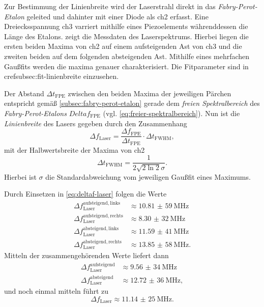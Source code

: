 \documentclass[../bericht.tex]{subfiles}
\begin{document}
        Zur Bestimmung der Linienbreite wird der Laserstrahl direkt in das \textit{Fabry-Perot-Etalon} geleited und dahinter mit einer Diode als ch2 erfasst. Eine Dreiecksspannung ch3 varriert mithilfe eines Piezoelements w\"ahrenddessen die L\"ange des Etalons.  zeigt die Messdaten des Laserspektrums. Hierbei liegen die ersten beiden Maxima von ch2 auf einem aufsteigenden Ast von ch3 und die zweiten beiden auf dem folgenden absteigenden Ast. Mithilfe eines mehrfachen Gau\ss{}fits werden die maxima genauer charakterisiert. Die Fitparameter sind in cref{subsec:fit-linienbreite} einzusehen.

        Der Abstand $\Delta t_\mathrm{FPE}$ zwischen den beiden Maxima der jeweiligen P\"archen entspricht gem\"a\ss{} \cref{subsec:fabry-perot-etalon} gerade dem \textit{freien Spektralbereich} des \textit{Fabry-Perot-Etalons} $Delta f_\mathrm{FPE}$ (vgl. \cref{eq:freier-spektralbereich}). Nun ist die \textit{Linienbreite} des Lasers gegeben durch den Zusammenhang
        \begin{equation}
          \Delta f_\mathrm{Laser} = \frac{\Delta f_\mathrm{FPE}}{\Delta t_\mathrm{FPE}}\cdot \Delta t_\mathrm{FWHM},
          \label{eq:deltaf-laser}
        \end{equation}
        mit der Halbwertsbreite der Maxima von ch2
        \begin{equation*}
          \Delta t_\mathrm{FWHM}=\frac{1}{2\sqrt{2\ln 2}\sigma}.
        \end{equation*}
        Hierbei ist $\sigma$ die Standardabweichung vom jeweiligen Gau\ss{}fit eines Maximums.

        Durch Einsetzen in \cref{eq:deltaf-laser} folgen die Werte
        \begin{align*}
          \Delta f_\mathrm{Laser}^\mathrm{aufsteigend, links}&\approx\SI{10,81(59)}{\mega\hertz} \\
          \Delta f_\mathrm{Laser}^\mathrm{aufsteigend, rechts}&\approx\SI{8,30(32)}{\mega\hertz} \\
          \Delta f_\mathrm{Laser}^\mathrm{absteigend, links}&\approx\SI{11,59(41)}{\mega\hertz} \\
          \Delta f_\mathrm{Laser}^\mathrm{absteigend, rechts}&\approx\SI{13,85(58)}{\mega\hertz}.
        \end{align*}
        Mitteln der zusammengeh\"orenden Werte liefert dann
        \begin{align*}
          \Delta f_\mathrm{Laser}^\mathrm{aufsteigend}&\approx\SI{9,56(34)}{\mega\hertz} \\
          \Delta f_\mathrm{Laser}^\mathrm{absteigend}&\approx\SI{12,72(36)}{\mega\hertz} ,
        \end{align*}
        und noch einmal mitteln f\"uhrt zu
        \begin{equation*}
          \Delta f_\mathrm{Laser}\approx\SI{11,14(25)}{\mega\hertz}.
        \end{equation*}
\end{document}
